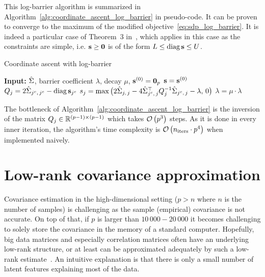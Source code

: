 This log-barrier algorithm is summarized in Algorithm~\ref{alg:coordinate_ascent_log_barrier} in pseudo-code.
It can be proven to converge to the maximum
of the modified objective~\ref{eq:sdp_log_barrier}.
It is indeed a particular case of Theorem~3 in~\cite{block_coordinate_sdp},
which applies in this case as the constraints are simple,
i.e. $\mathbf{s} \geq \mathbf{0}$ is of the form $L \leq \operatorname*{diag}\mathbf{s} \leq U$.
\begin{algorithm}[t]
    \caption{Coordinate ascent with log-barrier}\label{alg:coordinate_ascent_log_barrier}
    \begin{algorithmic}[1]
        \State \textbf{Input:} $\hat{\Sigma}$, barrier coefficient $\lambda$, decay $\mu$, $\mathbf{s}^{(0)} = \mathbf{0}_p$
        \State $\mathbf{s} = \mathbf{s}^{(0)}$
        \Repeat
        \State $Q_j = 2\hat{\Sigma}_{j^c,\, j^c} - \operatorname*{diag}\mathbf{s}_{j^c}$
        \State $s_j = \max\big( 2\hat{\Sigma}_{j,\, j} - 4\hat{\Sigma}_{j^c,\, j}^\top Q_j^{-1} \hat{\Sigma}_{j^c,\, j} - \lambda,\, 0 \big)$
        \EndFor
        \State $\lambda = \mu \cdot \lambda$
    \end{algorithmic}
\end{algorithm}

The bottleneck of Algorithm~\ref{alg:coordinate_ascent_log_barrier} is the inversion of the matrix
$Q_j \in \mathbb{R}^{(p - 1) \times (p - 1)}$ which takes $\mathcal{O}\left( p^3 \right)$ steps.
As it is done in every inner iteration, the algorithm's time complexity is
$\mathcal{O}\left( n_\text{iters} \cdot p^4 \right)$ when implemented naively.

\section{Low-rank covariance approximation}\label{sec:low_rank_sigma}

Covariance estimation in the high-dimensional setting ($p > n$ where $n$ is the number of samples)
is challenging as the sample (empirical) covariance is not accurate.
On top of that,
if $p$ is larger than $10\,000-20\,000$ it becomes challenging to solely store the covariance in the memory
of a standard computer.
Hopefully, big data matrices and especially correlation matrices often have an underlying low-rank structure,
or at least can be approximated adequately by such a low-rank estimate~\cite{big_data_low_rank}.
An intuitive explanation is that there is only a small number of latent features explaining most of the data.

